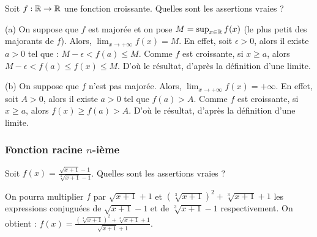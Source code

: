 \begin{question}
 
Soit  $f:\mathbb{R} \to \mathbb{R}$ une fonction croissante. Quelles sont les assertions vraies ?
\begin{answers}
      
      
      
    
   
\end{answers}
\begin{explanations}
(a)  On suppose que $f$ est majorée et on pose $M=\sup_{x\in \mathbb{R}} f(x)$ (le plus petit des majorants de $f$). Alors, $ \lim_{x\to +\infty } f(x)=M$. En effet,
soit $\epsilon >0$, alors il existe $a>0$ tel que : $M-\epsilon < f(a)\le M $. Comme $f$ est croissante, si $x\ge a$, alors $M-\epsilon < f(a)\le f(x)\le M $. D'où le résultat, d'après la définition d'une limite.

(b)  On suppose que $f$ n'est pas majorée. Alors, $ \lim_{x\to +\infty } f(x)=+\infty$. En effet, soit $A>0$, alors il existe $a>0$ tel que $f(a)>A$. Comme $f$ est croissante, si $x\ge a$, alors $f(x)\ge f(a)>A$. D'où le résultat, d'après la définition d'une limite.
\end{explanations}

\end{question}


\subsubsection{Fonction racine $n$-ième}


\begin{question}

Soit $f(x)= \frac{\sqrt{x+1}-1}{\sqrt[3]{x+1}-1}$. Quelles sont les assertions vraies ?
\begin{answers}

    
    
    
    

\end{answers}
\begin{explanations}
On pourra multiplier $f$ par  $\sqrt{x+1}+1$ et $(\sqrt[3]{x+1})^2+\sqrt[3]{x+1}+1$ les expressions conjuguées de $\sqrt{x+1}-1$ et de $\sqrt[3]{x+1}-1$ respectivement. On obtient : 
$f(x)=\frac{(\sqrt[3]{x+1})^2+\sqrt[3]{x+1}+1}{\sqrt{x+1}+1}$.
\end{explanations}

\end{question}


